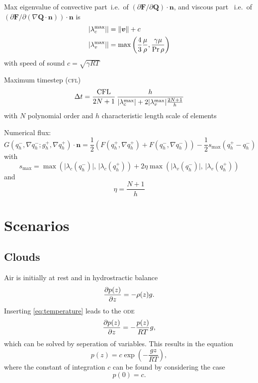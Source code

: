 Max eigenvalue of convective part \maxConvEigen\,i.e.\ of $\left( \partial \bm{F}/\partial \bm{Q}\right) \cdot \bm{n}$,
and viscous part \maxViscEigen\, i.e.\ of $\left( \partial \bm{F}/\partial \left( \nabla \bm{Q} \cdot \bm{n} \right)\right) \cdot \bm{n}$
is
\begin{align}
  \vert \lambda_c^{\text{max}} \vert \vert  &= \Vert \bm{v} \Vert + c\\
  \vert \lambda_v^{\text{max}} \vert \vert &= \max \left( \frac{4}{3} \frac{\mu}{\rho}
                                       , \frac{\gamma \mu}{\Pr \rho} \right)
\end{align}
with speed of sound $c = \sqrt{\gamma R T }$

Maximum timestep (\textsc{cfl})
\begin{equation}
 \Delta t = \frac{\text{CFL}}{2N + 1} \, \frac{h}{\vert \lambda_c^{\text{max}} \vert + 2 \vert \lambda_v^{\text{max}} \vert \frac{2N+1}{h}}
\end{equation}
with $N$ polynomial order and $h$ characteristic length scale of elements

Numerical flux:
\begin{equation}
  \label{eq:rusanov-flux}
  G(q_h^-, \nabla q_h^-; g_h^+, \nabla q_h^+) \cdot \bm{n} =
  \frac{1}{2} \left(
    F(q_h^+, \nabla q_h^+) +
    F(q_h^-, \nabla q_h^-)
  \right) -
  \frac{1}{2} s_\text{max} (q_h^+ - q_h^-)
\end{equation}
with
\begin{equation}
  \label{eq:parabolic-penalty}
  s_\text{max}  = \max \left(
\vert \lambda_c(q_h^-) \vert, \, \vert \lambda_c(q_h^+)
\right) +
2 \eta \max \left(
\vert \lambda_v(q_h^-) \vert, \, \vert \lambda_v(q_h^+)
\right)
\end{equation}
and
\begin{equation}
  \eta = \frac{N+1}{h}
\end{equation}


\section{Scenarios}
\label{sec:scenarios}

\subsection{Clouds}
Air is initially at rest and in hydrostractic balance
\begin{equation}
  \label{eq:hydrostatic-balance}
 \pdv{p (z)}{z} = -\rho(z) g.
\end{equation}
Inserting \cref{eq:temperature} leads to the \textsc{ode}
\begin{equation}
  \pdv{p(z)}{z} = - \frac{p(z)}{RT} g,
\end{equation}
which can be solved by seperation of variables.
This results in the equation
\begin{equation}
  \label{eq:bubble-pressure}
  p(z) = c \exp \left( - \frac{gz}{RT} \right),
\end{equation}
where the constant of integration $c$ can be found by considering the case
\begin{equation}
  p(0) = c.
\end{equation}

